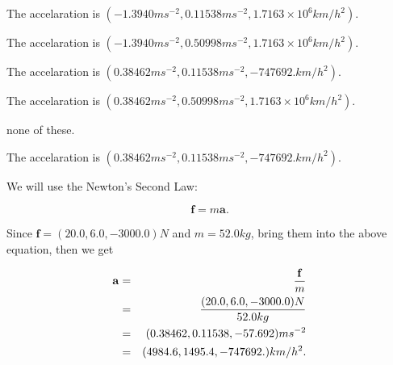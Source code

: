 \documentclass[12pt]{article}
\begin{document}
 
 
The accelaration is
$(
-1.3940ms^{-2},
0.11538ms^{-2},
1.7163 \times 10^{6}km/h^2
).
$
 
 
The accelaration is
$(
-1.3940ms^{-2},
0.50998ms^{-2},
1.7163 \times 10^{6}km/h^2
).
$
 
 
The accelaration is
$(
0.38462ms^{-2},
0.11538ms^{-2},
-747692.km/h^2
).
$
 
 
The accelaration is
$(
0.38462ms^{-2},
0.50998ms^{-2},
1.7163 \times 10^{6}km/h^2
).
$
 
 
none of these.
 
 
\noindent{}
 
 
The accelaration is
$(
0.38462ms^{-2},
0.11538ms^{-2},
-747692.km/h^2
).
$
 
 
\noindent{}
 
 
 
 
 
 
\noindent{}
 
 

We will use the Newton's Second Law:
 
\[
\mathbf{f}=m\mathbf{a}.
\]
 
Since $\mathbf{f}=( %
20.0,  %
6.0,  %
-3000.0 )N$
and $m= %
52.0kg$, bring them into the above equation, then we get
 
\begin{eqnarray*}
\mathbf{a}&=&\frac{\mathbf{f}}m  \\
&=&\frac{(
20.0 ,
6.0 ,
-3000.0 )N
}{ %
52.0 kg}  \\
&=&(
0.38462 ,
0.11538,
-57.692
)ms^{-2} \\
&=&(
4984.6 ,
1495.4 ,
-747692.
)km/h^2.
\end{eqnarray*}
 
 
 
\noindent{}
 
 

 
\vspace{0.3in}
   
   
   
\end{document}
